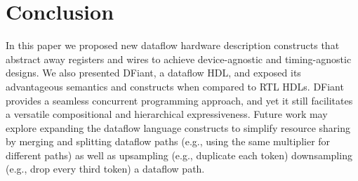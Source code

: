 \section{Conclusion}
\label{sec:conclusion}
In this paper we proposed new dataflow hardware description constructs that abstract away registers and wires to achieve device-agnostic and timing-agnostic designs. We also presented DFiant, a dataflow HDL, and exposed its advantageous semantics and constructs when compared to RTL HDLs. DFiant provides a seamless concurrent programming approach, and yet it still facilitates a versatile compositional and hierarchical expressiveness. 
Future work may explore expanding the dataflow language constructs to simplify resource sharing by merging and splitting dataflow paths (e.g., using the same multiplier for different paths) as well as upsampling (e.g., duplicate each token) downsampling (e.g., drop every third token) a dataflow path. 
